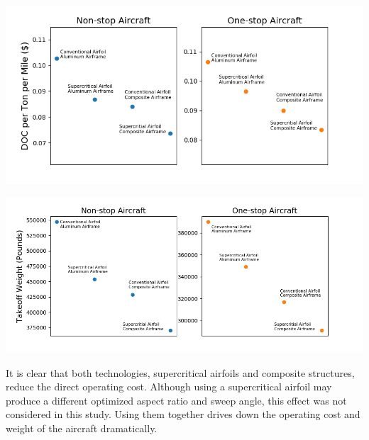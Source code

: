 \documentclass{article}
\begin{document}
        \begin{center}
            \includegraphics[scale=0.7]{tech.PNG}
            \label{fig:doc}
        \end{center}

        \begin{center}
            \includegraphics[scale=0.7]{tech_weight.PNG}
            \label{fig:weight}
        \end{center}

        \begin{flushleft}
            It is clear that both technologies, supercritical airfoils and
            composite structures, reduce the direct operating cost. Although
            using a supercritical airfoil may produce a different optimized
            aspect ratio and sweep angle, this effect was not considered in this
            study. Using them together drives down the operating cost and weight
            of the aircraft dramatically.
        \end{flushleft}
\end{document}

